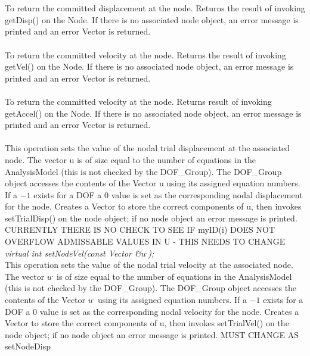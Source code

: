   \\
 \\
To return the committed displacement at the node. Returns the result
of invoking getDisp() on the Node. If there is no associated
node object, an error message is printed and an error Vector is
returned. \\


 \\
To return the committed velocity at the node. Returns the result of
invoking getVel() on the Node. If there is no associated node
object, an error message is printed and an error Vector is returned. \\

 \\
To return the committed velocity at the node. Returns result of
invoking  getAccel() on the Node. If there is no associated node
object, an error message is printed and an error Vector is returned. \\

 \\
This operation sets the value of the nodal trial displacement at the
associated node. The vector \p u is of size equal to the number of
equations in the AnalysisModel (this is not checked by the DOF\_Group).
The DOF\_Group object accesses the contents of the Vector \p u using
its assigned equation numbers. If a $-1$ exists for a DOF a $0$ value
is set as the corresponding nodal displacement for the node. Creates a Vector
to store the correct components of \p u, then invokes setTrialDisp()
on the node object; if no node object an error message is
printed. CURRENTLY THERE IS NO CHECK TO SEE IF myID(i) DOES NOT OVERFLOW
ADMISSABLE VALUES IN U - THIS NEEDS TO CHANGE \\


{\em virtual int setNodeVel(const Vector \&$u^{.}$);}\\
This operation sets the value of the nodal trial velocity at the
associated node. The vector {\em $u^{.}$} is of size equal to the number of
equations in the AnalysisModel (this is not checked by the DOF\_Group).
The DOF\_Group object accesses the contents of the Vector {\em $u^{.}$} using
its assigned equation numbers. If a $-1$ exists for a DOF a $0$ value
is set as the corresponding nodal velocity for the node.  Creates a Vector
to store the correct components of \p u, then invokes setTrialVel()
on the node object; if no node object an error message is printed. 
MUST CHANGE AS setNodeDisp \\

